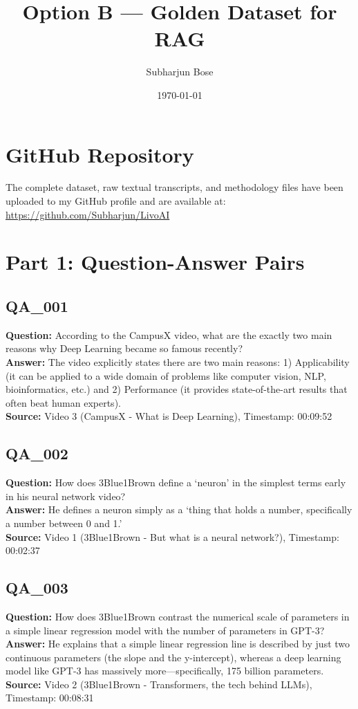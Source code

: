 \documentclass[12pt,a4paper]{article}
\title{Option B --- Golden Dataset for RAG}
\author{Subharjun Bose}
\date{\today}
\begin{document}
\maketitle

\section*{GitHub Repository}
The complete dataset, raw textual transcripts, and methodology files have been uploaded to my GitHub profile and are available at: \\
\url{https://github.com/Subharjun/LivoAI}

\section*{Part 1: Question-Answer Pairs}

\subsection*{QA\_001}
\textbf{Question:} According to the CampusX video, what are the exactly two main reasons why Deep Learning became so famous recently?\\
\textbf{Answer:} The video explicitly states there are two main reasons: 1) Applicability (it can be applied to a wide domain of problems like computer vision, NLP, bioinformatics, etc.) and 2) Performance (it provides state-of-the-art results that often beat human experts).\\
\textbf{Source:} Video 3 (CampusX - What is Deep Learning), Timestamp: 00:09:52

\subsection*{QA\_002}
\textbf{Question:} How does 3Blue1Brown define a `neuron' in the simplest terms early in his neural network video?\\
\textbf{Answer:} He defines a neuron simply as a `thing that holds a number, specifically a number between 0 and 1.'\\
\textbf{Source:} Video 1 (3Blue1Brown - But what is a neural network?), Timestamp: 00:02:37

\subsection*{QA\_003}
\textbf{Question:} How does 3Blue1Brown contrast the numerical scale of parameters in a simple linear regression model with the number of parameters in GPT-3?\\
\textbf{Answer:} He explains that a simple linear regression line is described by just two continuous parameters (the slope and the y-intercept), whereas a deep learning model like GPT-3 has massively more—specifically, 175 billion parameters.\\
\textbf{Source:} Video 2 (3Blue1Brown - Transformers, the tech behind LLMs), Timestamp: 00:08:31
\end{document}
